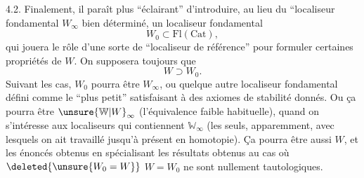 4.2. Finalement, il paraît plus ``éclairant'' d'introduire, au lieu du ``localiseur fondamental $W_\infty$
bien déterminé, un localiseur fondamental
\[
W_0\subset\mathrm{Fl}(\mathrm{Cat}),
\]
qui jouera le rôle d'une sorte de ``localiseur de
référence'' pour formuler certaines propriétés de $W$.
On  supposera toujours que
\[
W\supset W_0.
\]
Suivant les cas, $W_0$ pourra être $W_\infty$, ou quelque
autre localiseur fondamental défini comme le
``plus petit'' satisfaisant à des axiomes de stabilité
donnés. Ou ça pourra être $\unsure{\mathbb W|W}_\infty$ (l'équivalence
faible habituelle), quand on s'intéresse aux
localiseurs qui contiennent $\mathbb W_\infty$ (les seuls, apparemment, avec lesquels on ait travaillé jusqu'à présent en homotopie). Ça pourra être
aussi $W$, et les énoncés obtenus en spécialisant les résultats obtenus au cas où $\deleted{\unsure{W_0=W}}$
$W=W_0$ ne sont nullement tautologiques.

